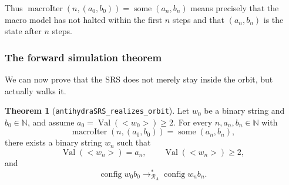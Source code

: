 \documentclass[11pt,a4paper]{article}
\theoremstyle{definition}
\newtheorem{theorem}[definition]{Theorem}
\newcommand{\lt}{<}
\newcommand{\gt}{>}
\newcommand{\Nat}{\mathbb{N}}
\newcommand{\val}{\operatorname{Val}}
\newcommand{\config}{\operatorname{config}}
\newcommand{\antihydraSRS}{\mathcal{R}_{A}}
\newcommand{\some}{\operatorname{some}}
\newcommand{\macroIter}{\operatorname{macroIter}}
\begin{document}
Thus $\macroIter(n,(a_0,b_0))=\some(a_n,b_n)$ means precisely that the
macro model has not halted within the first $n$ steps and that
$(a_n,b_n)$ is the state after $n$ steps.

\subsubsection{The forward simulation theorem}

We can now prove that the SRS does not merely stay inside the orbit, but
actually walks it.

\begin{theorem}[\texttt{antihydraSRS\_realizes\_orbit}]
\label{thm:forward-simulation}
Let $w_0$ be a binary string and $b_0\in\Nat$, and assume
$a_0=\val(\lt w_0\gt)\ge2$.  For every $n,a_n,b_n\in\Nat$ with
\[
  \macroIter(n,(a_0,b_0))=\some(a_n,b_n),
\]
there exists a binary string $w_n$ such that
\[
  \val(\lt w_n\gt)=a_n,\qquad \val(\lt w_n\gt)\ge2,
\]
and
\[
  \config{w_0}{b_0}
  \to^{*}_{\antihydraSRS}
  \config{w_n}{b_n}.
\]
\end{theorem}
\end{document}
